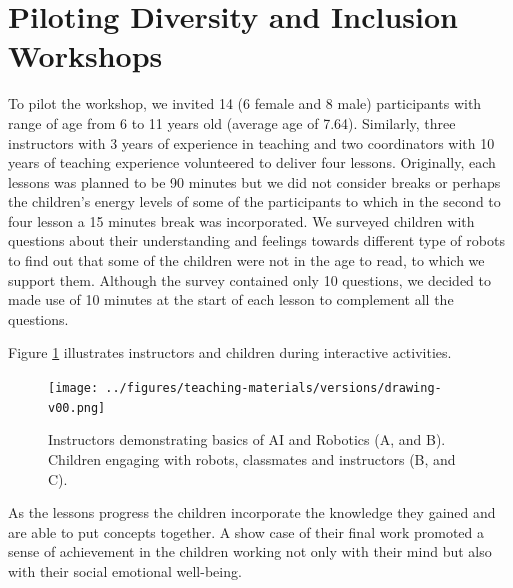 \documentclass[conference]{IEEEtran}
\begin{document}
\section{Piloting Diversity and Inclusion Workshops}
To pilot the workshop, we invited 14 (6 female and 8 male) participants with range of age from 6 to 11 years old (average age of 7.64).
Similarly, three instructors with 3 years of experience in teaching and two coordinators with 10 years of teaching experience volunteered to deliver four lessons.
Originally, each lessons was planned to be 90 minutes but we did not consider breaks or perhaps the children's energy levels of some of the participants to which in the second to four lesson a 15 minutes break was incorporated.
We surveyed children with questions about their understanding and feelings towards different type of robots to find out that some of the children were not in the age to read, to which we support them. 
Although the survey contained only 10 questions, we decided to made use of 10 minutes at the start of each lesson to complement all the questions.

Figure \ref{fig:pilot} illustrates instructors and children during interactive activities. 
\begin{figure}[htbp]
    \texttt{[image: ../figures/teaching-materials/versions/drawing-v00.png]}
    \caption{
        Instructors demonstrating basics of AI and Robotics (A, and B). 
        Children engaging with robots, classmates and instructors (B, and C).
        }
    \label{fig:pilot}
\end{figure}


As the lessons progress the children incorporate the knowledge they gained and are able to put concepts together. 
A show case of their final work promoted a sense of achievement in the children working not only with their mind but also with their social emotional well-being. 


    
\end{document}
